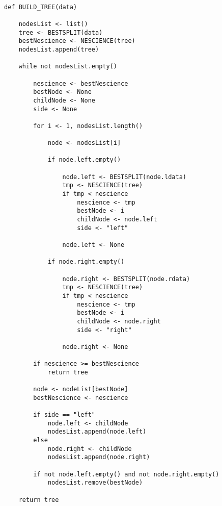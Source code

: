 \begin{sourcecode}
\label{algorithm:decision_tree}
{\scriptsize \begin{verbatim}

def BUILD_TREE(data)

    nodesList <- list()
    tree <- BESTSPLIT(data)
    bestNescience <- NESCIENCE(tree)
    nodesList.append(tree)

    while not nodesList.empty()
    
        nescience <- bestNescience
        bestNode <- None
        childNode <- None
        side <- None
        
        for i <- 1, nodesList.length()

            node <- nodesList[i]
            
            if node.left.empty()
            
                node.left <- BESTSPLIT(node.ldata)
                tmp <- NESCIENCE(tree)
                if tmp < nescience
                    nescience <- tmp
                    bestNode <- i
                    childNode <- node.left
                    side <- "left"
                
                node.left <- None

            if node.right.empty()
            
                node.right <- BESTSPLIT(node.rdata)
                tmp <- NESCIENCE(tree)
                if tmp < nescience
                    nescience <- tmp
                    bestNode <- i
                    childNode <- node.right
                    side <- "right"
                
                node.right <- None

        if nescience >= bestNescience
            return tree

        node <- nodeList[bestNode]
        bestNescience <- nescience
            
        if side == "left"
            node.left <- childNode
            nodesList.append(node.left)
        else
            node.right <- childNode
            nodesList.append(node.right)
            
        if not node.left.empty() and not node.right.empty()
            nodesList.remove(bestNode)
    
    return tree
\end{verbatim}}
\end{sourcecode}

